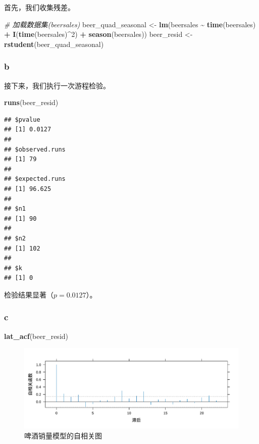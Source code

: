 \documentclass[
]{article}
\newenvironment{Shaded}{\begin{snugshade}}{\end{snugshade}}
\newcommand{\CommentTok}[1]{\textcolor[rgb]{0.56,0.35,0.01}{\textit{#1}}}
\newcommand{\DecValTok}[1]{\textcolor[rgb]{0.00,0.00,0.81}{#1}}
\newcommand{\FunctionTok}[1]{\textcolor[rgb]{0.13,0.29,0.53}{\textbf{#1}}}
\newcommand{\NormalTok}[1]{#1}
\newcommand{\OtherTok}[1]{\textcolor[rgb]{0.56,0.35,0.01}{#1}}
\newcommand{\SpecialCharTok}[1]{\textcolor[rgb]{0.81,0.36,0.00}{\textbf{#1}}}
\begin{document}
首先，我们收集残差。

\begin{Shaded}
\begin{Highlighting}[]
\CommentTok{\# 加载数据集(beersales)}
\NormalTok{beer\_quad\_seasonal }\OtherTok{\textless{}{-}} \FunctionTok{lm}\NormalTok{(beersales }\SpecialCharTok{\textasciitilde{}} \FunctionTok{time}\NormalTok{(beersales) }\SpecialCharTok{+} \FunctionTok{I}\NormalTok{(}\FunctionTok{time}\NormalTok{(beersales)}\SpecialCharTok{\^{}}\DecValTok{2}\NormalTok{) }\SpecialCharTok{+}
                           \FunctionTok{season}\NormalTok{(beersales))}
\NormalTok{beer\_resid }\OtherTok{\textless{}{-}} \FunctionTok{rstudent}\NormalTok{(beer\_quad\_seasonal)}
\end{Highlighting}
\end{Shaded}

\hypertarget{b-6}{%
\subsubsection*{b}\label{b-6}}

接下来，我们执行一次游程检验。

\begin{Shaded}
\begin{Highlighting}[]
\FunctionTok{runs}\NormalTok{(beer\_resid)}
\end{Highlighting}
\end{Shaded}

\begin{verbatim}
## $pvalue
## [1] 0.0127
## 
## $observed.runs
## [1] 79
## 
## $expected.runs
## [1] 96.625
## 
## $n1
## [1] 90
## 
## $n2
## [1] 102
## 
## $k
## [1] 0
\end{verbatim}

检验结果显著（\(p = 0.0127\)）。

\hypertarget{c-5}{%
\subsubsection*{c}\label{c-5}}

\begin{Shaded}
\begin{Highlighting}[]
\FunctionTok{lat\_acf}\NormalTok{(beer\_resid)}
\end{Highlighting}
\end{Shaded}

\begin{figure}
\centering
\includegraphics{chapter3_files/figure-latex/beer-acf-1.pdf}
\caption{\label{fig:beer-acf}啤酒销量模型的自相关图}
\end{figure}
\end{document}

